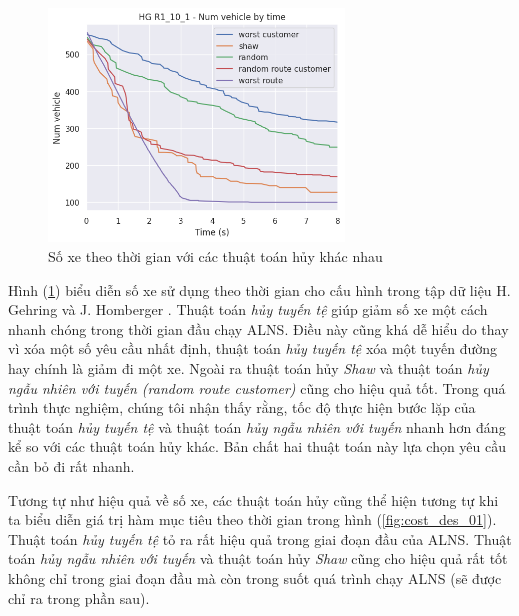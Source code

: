 \begin{figure}[H] %
	\centering %
	\includegraphics[width=0.7\textwidth]{figures/nv_time_des_10s_R1_10_1.png}
	\caption{Số xe theo thời gian với các thuật toán hủy khác nhau}
	\label{fig:nv_des_01}
\end{figure}

Hình (\ref{fig:nv_des_01}) biểu diễn số xe sử dụng theo thời gian cho cấu hình  trong tập dữ liệu H. Gehring và J. Homberger \cite{gehring1999parallel}. Thuật toán \textit{hủy tuyến tệ} giúp giảm số xe một cách nhanh chóng trong thời gian đầu chạy ALNS. Điều này cũng khá dễ hiểu do thay vì xóa một số yêu cầu nhất định, thuật toán \textit{hủy tuyến tệ} xóa một tuyến đường hay chính là giảm đi một xe. Ngoài ra thuật toán hủy \textit{Shaw} và thuật toán \textit{hủy ngẫu nhiên với tuyến (random route customer)} cũng cho hiệu quả tốt. Trong quá trình thực nghiệm, chúng tôi nhận thấy rằng, tốc độ thực hiện bước lặp của thuật toán \textit{hủy tuyến tệ} và thuật toán \textit{hủy ngẫu nhiên với tuyến} nhanh hơn đáng kể so với các thuật toán hủy khác. Bản chất hai thuật toán này lựa chọn yêu cầu cần bỏ đi rất nhanh.

Tương tự như hiệu quả về số xe, các thuật toán hủy cũng thể hiện tương tự khi ta biểu diễn giá trị hàm mục tiêu theo thời gian trong hình (\ref{fig:cost_des_01}). Thuật toán \textit{hủy tuyến tệ} tỏ ra rất hiệu quả trong giai đoạn đầu của ALNS. Thuật toán \textit{hủy ngẫu nhiên với tuyến} và thuật toán hủy \textit{Shaw} cũng cho hiệu quả rất tốt không chỉ trong giai đoạn đầu mà còn trong suốt quá trình chạy ALNS (sẽ được chỉ ra trong phần sau).

